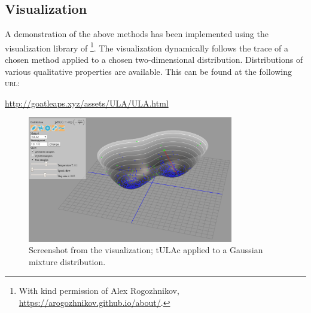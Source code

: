 \subsection{Visualization}
A demonstration of the above methods has been implemented using the visualization library of \cite{rogozhnikov2016hmc}\footnote{With kind permission of Alex Rogozhnikov, \url{https://arogozhnikov.github.io/about/}.}. The visualization dynamically follows the trace of a chosen method applied to a chosen two-dimensional distribution. Distributions of various qualitative properties are available. This can be found at the following \textsc{url}: \\
   \centerline{ \url{http://goatleaps.xyz/assets/ULA/ULA.html}}

\begin{figure}[H]
\centering
  \begin{minipage}[b]{0.8\textwidth}
  \centering
    \includegraphics[width=0.8\textwidth]{Figures/ulavis.PNG}
    \caption{Screenshot from the visualization;  tULAc applied to a Gaussian mixture distribution.}
  \end{minipage}
\end{figure}

